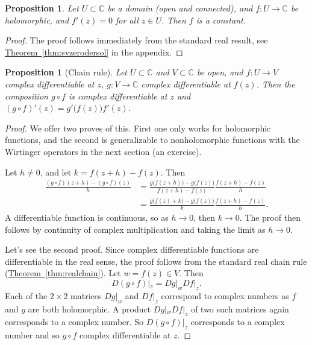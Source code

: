 \documentclass[12pt,openany]{book}
\newcommand{\C}{{\mathbb{C}}}
\theoremstyle{plain}
\newtheorem{prop}[thm]{Proposition}
\theoremstyle{remark}
\theoremstyle{definition}
\theoremstyle{exercise}
\theoremstyle{example}
\newcommand{\thmref}[1]{\hyperref[#1]{Theorem~\ref*{#1}}}
\begin{document}
\begin{prop}
Let $U \subset \C$ be a domain (open and connected),
and $f \colon U \to \C$ be holomorphic, and $f'(z) = 0$ for all $z \in U$.
Then $f$ is a constant.
\end{prop}

\begin{proof}
The proof follows immediately from the standard real result,
see \thmref{thm:svzerodersol} in the appendix.
\end{proof}

\begin{prop}[Chain rule]
Let $U \subset \C$ and $V \subset \C$ be open, and $f \colon U \to V$
complex differentiable at $z$, $g \colon V \to \C$ complex differentiable
at $f(z)$.  Then the composition $g \circ f$
is complex differentiable at $z$ and $(g \circ f)'(z) = g'\bigl(f(z)\bigr) f'(z)$.
\end{prop}

\begin{proof}
We offer two proves of this.  First one only works for holomorphic
functions, and the second is generalizable to nonholomorphic functions
with the Wirtinger operators in the next section (an exercise).

Let $h \not= 0$, and let $k = f(z+h) -f(z)$.  Then
\begin{equation*}
\begin{split}
\frac{(g \circ f)(z+h) - (g \circ f)(z)}{h}
& =
\frac{g \bigl( f(z+h) \bigr) - g\bigl( f(z) \bigr)}{f(z+h)-f(z)}
\frac{f(z+h)-f(z)}{h}
\\
& =
\frac{g \bigl( f(z) + k \bigr) - g\bigl( f(z) \bigr)}{k}
\frac{f(z+h)-f(z)}{h} .
\end{split}
\end{equation*}
A differentiable function is continuous, so as $h \to 0$, then $k \to 0$.
The proof then follows by continuity of complex multiplication and taking
the limit as $h \to 0$.

Let's see the second proof.
Since complex differentiable functions are differentiable in the real sense,
the proof follows from the standard real chain rule (\thmref{thm:realchain}).
Let $w = f(z) \in V$.  Then
\begin{equation*}
D(g \circ f)|_z = Dg|_w Df|_z .
\end{equation*}
Each of the $2 \times 2$ matrices $Dg|_w$ and $Df|_z$ correspond to complex
numbers as $f$ and $g$ are both holomorphic.  A product $Dg|_w Df|_z$
of two such matrices again corresponds to a complex number.  So
$D(g \circ f)|_z$ corresponds to a complex number and so $g \circ f$
complex differentiable at $z$.
\end{proof}
\end{document}
